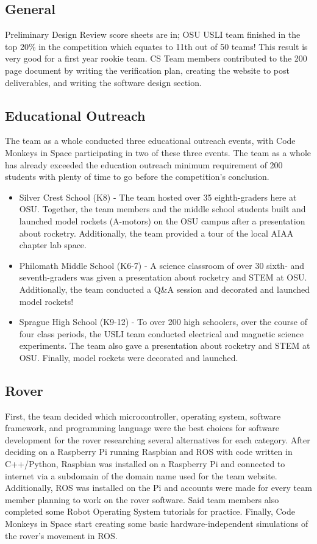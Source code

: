 \documentclass[onecolumn, draftclsnofoot,10pt, compsoc]{IEEEtran}
\begin{document}
\subsection{General}
Preliminary Design Review score sheets are in; OSU USLI team finished in the top 20\% in the competition which equates to 11th out of 50 teams! This result is very good for a first year rookie team. CS Team members contributed to the 200 page document by writing the verification plan, creating the website to post deliverables, and writing the software design section.
\subsection{Educational Outreach}
The team as a whole conducted three educational outreach events, with Code Monkeys in Space participating in two of these three events. The team as a whole has already exceeded the education outreach minimum requirement of 200 students with plenty of time to go before the competition's conclusion.
\begin{itemize}
\item Silver Crest School (K8) - The team hosted over 35 eighth-graders here at OSU. Together, the team members and the middle school students built and launched model rockets (A-motors) on the OSU campus after a presentation about rocketry. Additionally, the team provided a tour of the local AIAA chapter lab space.
\item Philomath Middle School (K6-7) - A science classroom of over 30 sixth- and seventh-graders was given a presentation about rocketry and STEM at OSU. Additionally, the team conducted a Q\&A session and decorated and launched model rockets!
\item Sprague High School (K9-12) - To over 200 high schoolers, over the course of four class periods, the USLI team conducted electrical and magnetic science experiments. The team also gave a presentation about rocketry and STEM at OSU. Finally, model rockets were decorated and launched.
\end{itemize}
\subsection{Rover}
First, the team decided which microcontroller, operating system, software framework, and programming language were the best choices for software development for the rover researching several alternatives for each category. After deciding on a Raspberry Pi running Raspbian and ROS with code written in C++/Python, Raspbian was installed on a Raspberry Pi and connected to internet via a subdomain of the domain name used for the team website. Additionally, ROS was installed on the Pi and accounts were made for every team member planning to work on the rover software. Said team members also completed some Robot Operating System tutorials for practice. Finally, Code Monkeys in Space start creating some basic hardware-independent simulations of the rover's movement in ROS.
\end{document}
